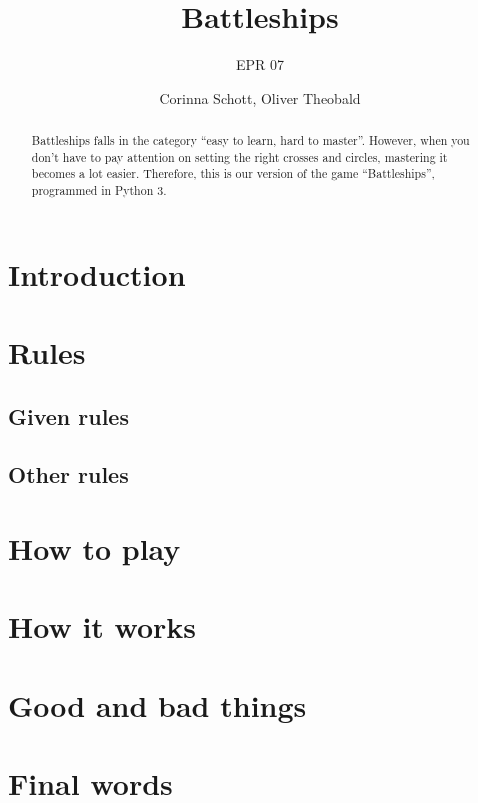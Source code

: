 \documentclass[12pt]{scrartcl}
\author{Corinna Schott, Oliver Theobald}
\title{Battleships}
\subtitle{EPR 07}
\begin{document}
	\maketitle
	\begin{abstract}
		Battleships falls in the category \enquote{easy to learn, hard to master}.
		However, when you don't have to pay attention on setting the right crosses and circles, mastering it becomes a lot easier.
		Therefore, this is our version of the game \enquote{Battleships}, programmed in Python 3.
	\end{abstract}
	\tableofcontents
	\clearpage


	\section{Introduction}\label{sec:introduction}


	\section{Rules}\label{sec:rules}

	\subsection{Given rules}\label{subsec:given_rules}

	\subsection{Other rules}\label{subsec:other_rules}


	\section{How to play}\label{sec:how_to_play}


	\section{How it works}\label{sec:how_it_works}


	\section{Good and bad things}\label{sec:good_and_bad_things}


	\section{Final words}\label{sec:final_words}
\end{document}
